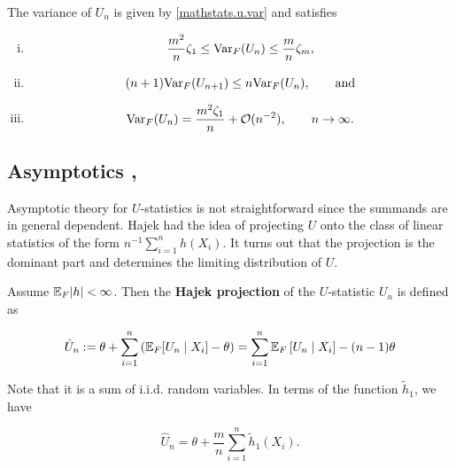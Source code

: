 \begin{lemma}

The variance of \(U_n\) is given by \eqref{mathstats.u.var} and satisfies

\begin{enumerate}[(i)]

\item

\[
\frac{m^2}{n} \zeta_1 \leq \Var_F(U_n) \leq \frac{m}{n} \zeta_m,
\]


\item

\[
(n+1)\Var_F(U_{n+1}) \leq n \Var_F(U_n), \qquad \text{and}
\]

\item

\[
\Var_F(U_n) = \frac{m^2 \zeta_1}{n} + \mathcal{O}(n^{-2}), \qquad n \to \infty.
\]

\end{enumerate}

\end{lemma}

\subsection{Asymptotics \cite[Section 5.3]{serfling1980}, \cite[Section 15.2]{dasgupta2008asymptotic}}


Asymptotic theory for \(U\)-statistics is not straightforward since the summands are in general dependent. Hajek had the idea of projecting \(U\) onto the class of linear statistics of the form \(n^{-1} \sum_{i=1}^n h(X_i)\). It turns out that the projection is the dominant part and determines the limiting distribution of \(U\). 

\begin{definition}

Assume \(\E_F |h| < \infty\). Then the \textbf{Hajek projection} of the \(U\)-statistic \(U_n\) is defined as 

\[
\hat{U}_n :=  \theta + \sum_{i=1}^n \left( \E_F[U_n \mid X_i ]  - \theta \right) =\sum_{i=1}^n \E_F\left[ U_n \mid X_i \right] - (n-1) \theta
\]

Note that it is a sum of i.i.d. random variables. In terms of the function \(\tilde{h}_1\), we have

\[
\hat{U}_n  = \theta + \frac{m}{n} \sum_{i=1}^n \tilde{h}_1(X_i).
\]

\end{definition}

